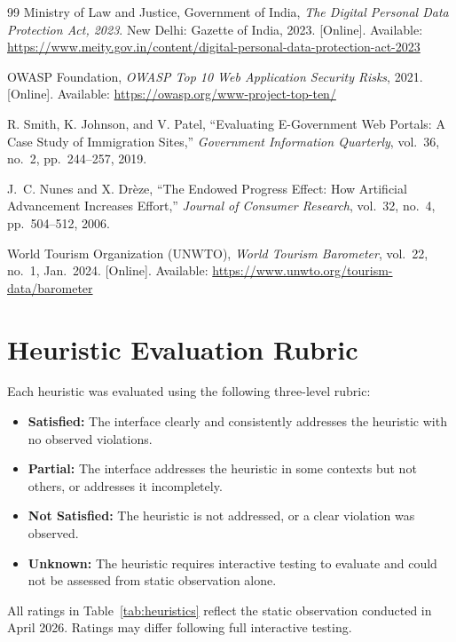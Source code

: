 \documentclass[journal, 10pt, twoside]{IEEEtran}
\begin{document}
\begin{thebibliography}{99}
  Ministry of Law and Justice, Government of India,
  \textit{The Digital Personal Data Protection Act, 2023}.
  New Delhi: Gazette of India, 2023.
  [Online]. Available:
  \url{https://www.meity.gov.in/content/digital-personal-data-protection-act-2023}

  OWASP Foundation,
  \textit{OWASP Top 10 Web Application Security Risks}, 2021.
  [Online]. Available: \url{https://owasp.org/www-project-top-ten/}

  R. Smith, K. Johnson, and V. Patel,
  ``Evaluating E-Government Web Portals: A Case Study of Immigration
  Sites,''
  \textit{Government Information Quarterly}, vol.~36, no.~2,
  pp.~244--257, 2019.

  J.~C. Nunes and X. Drèze,
  ``The Endowed Progress Effect: How Artificial Advancement Increases
  Effort,''
  \textit{Journal of Consumer Research}, vol.~32, no.~4,
  pp.~504--512, 2006.

  World Tourism Organization (UNWTO),
  \textit{World Tourism Barometer}, vol.~22, no.~1, Jan.\ 2024.
  [Online]. Available: \url{https://www.unwto.org/tourism-data/barometer}

\end{thebibliography}

\appendices

\section{Heuristic Evaluation Rubric}
\label{app:heuristic}
Each heuristic was evaluated using the following three-level rubric:
\begin{itemize}
  \item \textbf{Satisfied:} The interface clearly and consistently
  addresses the heuristic with no observed violations.
  \item \textbf{Partial:} The interface addresses the heuristic in
  some contexts but not others, or addresses it incompletely.
  \item \textbf{Not Satisfied:} The heuristic is not addressed, or
  a clear violation was observed.
  \item \textbf{Unknown:} The heuristic requires interactive testing
  to evaluate and could not be assessed from static observation alone.
\end{itemize}
All ratings in Table~\ref{tab:heuristics} reflect the static
observation conducted in April 2026. Ratings may differ following
full interactive testing.
\end{document}
